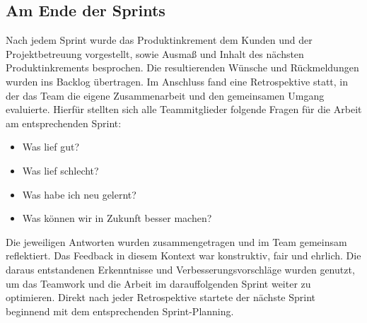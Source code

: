 \documentclass[10pt, a4paper]{article}
\begin{document}
\begin{onehalfspace}
  \subsection{Am Ende der Sprints}
  Nach jedem Sprint wurde das Produktinkrement dem Kunden und der Projektbetreuung vorgestellt, sowie Ausmaß und Inhalt des nächsten Produktinkrements besprochen.
  Die resultierenden Wünsche und Rückmeldungen wurden ins Backlog übertragen.
  Im Anschluss fand eine Retrospektive statt,
  in der das Team die eigene Zusammenarbeit und den gemeinsamen Umgang evaluierte.
  Hierfür stellten sich alle Teammitglieder folgende Fragen für die Arbeit am entsprechenden Sprint:
  \begin{itemize}[noitemsep,topsep=0pt,parsep=0pt,partopsep=0pt]
    \item Was lief gut?
    \item Was lief schlecht?
    \item Was habe ich neu gelernt?
    \item Was können wir in Zukunft besser machen?
  \end{itemize}
  Die jeweiligen Antworten wurden zusammengetragen und im Team gemeinsam reflektiert.
  Das Feedback in diesem Kontext war konstruktiv, fair und ehrlich.
  Die daraus entstandenen Erkenntnisse und Verbesserungsvorschläge wurden genutzt, um das Teamwork und die Arbeit im darauffolgenden Sprint weiter zu optimieren.
  Direkt nach jeder Retrospektive startete der nächste Sprint beginnend mit dem entsprechenden Sprint-Planning.


\end{onehalfspace}
\end{document}
